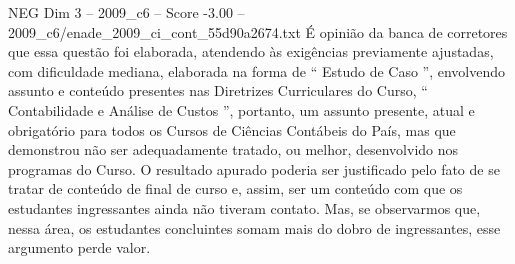 \begin{textsample}{NEG Dim 3 – 2009\_c6 – Score -3.00 – 2009\_c6/enade\_2009\_ci\_cont\_55d90a2674.txt}
É opinião da banca de corretores que essa questão foi elaborada, atendendo às exigências previamente ajustadas, com dificuldade mediana, elaborada na forma de “ Estudo de Caso ”, envolvendo assunto e conteúdo presentes nas Diretrizes Curriculares do Curso, “ Contabilidade e Análise de Custos ”, portanto, um assunto presente, atual e obrigatório para todos os Cursos de Ciências Contábeis do País, mas que demonstrou não ser adequadamente tratado, ou melhor, desenvolvido nos programas do Curso.
O resultado apurado poderia ser justificado pelo fato de se tratar de conteúdo de final de curso e, assim, ser um conteúdo com que os estudantes ingressantes ainda não tiveram contato.
Mas, se observarmos que, nessa área, os estudantes concluintes somam mais do dobro de ingressantes, esse argumento perde valor.

\end{textsample}
